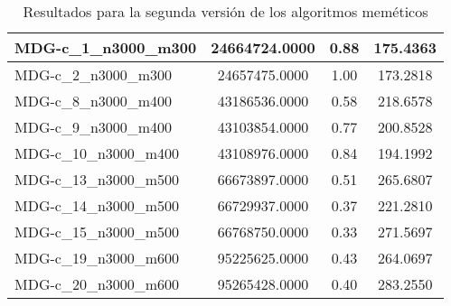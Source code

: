 \documentclass[10pt,a4paper]{article}
\begin{document}
\begin{table}[H]
\begin{center}
\begin{tabular}{|l|c|c|c|}
					MDG-c\_1\_n3000\_m300 & 24664724.0000 & 0.88 & 175.4363 \\ \hline
					MDG-c\_2\_n3000\_m300 & 24657475.0000 & 1.00 & 173.2818 \\ \hline
					MDG-c\_8\_n3000\_m400 & 43186536.0000 & 0.58 & 218.6578 \\ \hline
					MDG-c\_9\_n3000\_m400 & 43103854.0000 & 0.77 & 200.8528 \\ \hline
					MDG-c\_10\_n3000\_m400 & 43108976.0000 & 0.84 & 194.1992 \\ \hline
					MDG-c\_13\_n3000\_m500 & 66673897.0000 & 0.51 & 265.6807 \\ \hline
					MDG-c\_14\_n3000\_m500 & 66729937.0000 & 0.37 & 221.2810 \\ \hline
					MDG-c\_15\_n3000\_m500 & 66768750.0000 & 0.33 & 271.5697 \\ \hline
					MDG-c\_19\_n3000\_m600 & 95225625.0000 & 0.43 & 264.0697 \\ \hline
					MDG-c\_20\_n3000\_m600 & 95265428.0000 & 0.40 & 283.2550 \\ \hline
				\end{tabular}
				\caption{Resultados para la segunda versión de los algoritmos meméticos}
				\label{}
				\end{center}
			\end{table}
			
\newpage
\end{document}
